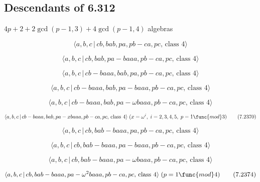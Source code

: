 \documentclass[10pt]{article}
\begin{document}
\subsection{Descendants of 6.312}

$4p+2+2\gcd (p-1,3)+4\gcd (p-1,4)$ algebras

\begin{equation}
\langle a,b,c\,|\,cb,bab,pa,pb-ca,pc,\,\text{class }4\rangle  \tag{7.2365}
\end{equation}

\begin{equation}
\langle a,b,c\,|\,cb,bab,pa-baaa,pb-ca,pc,\,\text{class }4\rangle 
\tag{7.2366}
\end{equation}

\begin{equation}
\langle a,b,c\,|\,cb-baaa,bab,pa,pb-ca,pc,\,\text{class }4\rangle 
\tag{7.2367}
\end{equation}

\begin{equation}
\langle a,b,c\,|\,cb-baaa,bab,pa-baaa,pb-ca,pc,\,\text{class }4\rangle 
\tag{7.2368}
\end{equation}

\begin{equation}
\langle a,b,c\,|\,cb-baaa,bab,pa-\omega baaa,pb-ca,pc,\,\text{class }4\rangle
\tag{7.2369}
\end{equation}

\begin{equation}
\langle a,b,c\,|\,cb-baaa,bab,pa-xbaaa,pb-ca,pc,\,\text{class }4\rangle
\;(x=\omega ^{i},\;i=2,3,4,5,\;p=1\func{mod}3)  \tag{7.2370}
\end{equation}

\begin{equation}
\langle a,b,c\,|\,cb,bab-baaa,pa,pb-ca,pc,\,\text{class }4\rangle 
\tag{7.2371}
\end{equation}

\begin{equation}
\langle a,b,c\,|\,cb,bab-baaa,pa-baaa,pb-ca,pc,\,\text{class }4\rangle 
\tag{7.2372}
\end{equation}

\begin{equation}
\langle a,b,c\,|\,cb,bab-baaa,pa-\omega baaa,pb-ca,pc,\,\text{class }4\rangle
\tag{7.2373}
\end{equation}

\begin{equation}
\langle a,b,c\,|\,cb,bab-baaa,pa-\omega ^{2}baaa,pb-ca,pc,\,\text{class }%
4\rangle \;(p=1\func{mod}4)  \tag{7.2374}
\end{equation}
\end{document}
